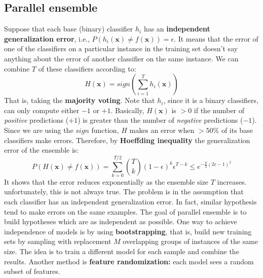 \subsection{Parallel ensemble}
Suppose that each base (binary) classifier $h_{i}$ has an \textbf{independent generalization error}, i.e., $P(h_{i}(\textbf{x}) \neq f(\textbf{x})) = \epsilon$. It means that the error of one of the classifiers on a particular instance in the training set doesn't say anything about the error of another classifier on the same instance. \newline\newline
We can combine $T$ of these classifiers according to:
\[H(\textbf{x}) = sign\left(\sum_{i=1}^{T}h_{i}(\textbf{x})\right)\]
That is, taking the \textbf{majority voting}. Note that $h_{i}$, since it is a binary classifiers, can only compute either $-1$ or $+1$. Basically, $H(\textbf{x})$ is $> 0$ if the number of \textit{positive} predictions ($+1$) is greater than the number of \textit{negative} predictions ($-1$). Since we are using the $sign$ function, $H$ makes an error when $> 50\%$ of its base classifiers make errors. Therefore, by \textbf{Hoeffding inequality} the generalization error of the ensemble is:
\[P(H(\textbf{x}) \neq f(\textbf{x})) = \sum_{k=0}^{T/2}{T \choose k}(1 - \epsilon)^{k} \epsilon^{T-k} \leq e^{-\frac{T}{2}(2\epsilon - 1)^{2}}\]
It shows that the error reduces exponentially as the ensemble size $T$ increases.\newline\newline
unfortunately, this is not always true. The problem is in the assumption that each classifier has an independent generalization error. In fact, similar hypothesis tend to make errors on the same examples. The goal of parallel ensemble is to build hypotheses which are as independent as possible.\newline\newline
One way to achieve independence of models is by using \textbf{bootstrapping}, that is, build new training sets by sampling with replacement $M$ overlapping groups of instances of the same size. The idea is to train a different model for each sample and combine the results.\newline\newline 
Another method is \textbf{feature randomization:} each model sees a random subset of features.\newline\newline
